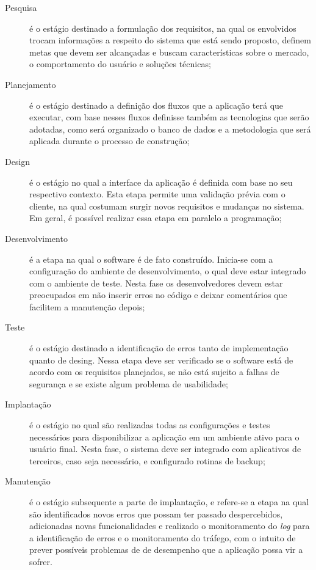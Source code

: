 \begin{description}
    \item[Pesquisa]{é o estágio destinado a formulação dos requisitos, na qual os
    envolvidos trocam informações a respeito do sistema que está sendo proposto,
    definem metas que devem ser alcançadas e buscam características sobre o mercado,
    o comportamento do usuário e soluções técnicas;}
    \item[Planejamento]{é o estágio destinado a definição dos fluxos que a aplicação
    terá que executar, com base nesses fluxos definisse também as tecnologias que
    serão adotadas, como será organizado o banco de dados e a metodologia que será
    aplicada durante o processo de construção;}
    \item[Design]{é o estágio no qual a interface da aplicação é definida com base
    no seu respectivo contexto. Esta etapa permite uma validação prévia com o cliente,
    na qual costumam surgir novos requisitos e mudanças no sistema. Em geral, é possível
    realizar essa etapa em paralelo a programação;}
    \item[Desenvolvimento]{é a etapa na qual o software é de fato construído. Inicia-se
    com a configuração do ambiente de desenvolvimento, o qual deve estar integrado com o
    ambiente de teste. Nesta fase os desenvolvedores devem estar preocupados em não
    inserir erros no código e deixar comentários que facilitem a manutenção depois;}
    \item[Teste]{é o estágio destinado a identificação de erros tanto de implementação
    quanto de desing. Nessa etapa deve ser verificado se o software está de acordo com
    os requisitos planejados, se não está sujeito a falhas de segurança e se existe
    algum problema de usabilidade;}
    \item[Implantação]{é o estágio no qual são realizadas todas as configurações e testes
    necessários para disponibilizar a aplicação em um ambiente ativo para o usuário final.
    Nesta fase, o sistema deve ser integrado com aplicativos de terceiros, caso seja
    necessário, e configurado rotinas de backup;}
    \item[Manutenção]{é o estágio subsequente a parte de implantação, e refere-se a etapa
    na qual são identificados novos erros que possam ter passado despercebidos, adicionadas
    novas funcionalidades e realizado o monitoramento do \textit{log} para a identificação
    de erros e o monitoramento do tráfego, com o intuito de prever possíveis problemas de
    de desempenho que a aplicação possa vir a sofrer.}
\end{description}

